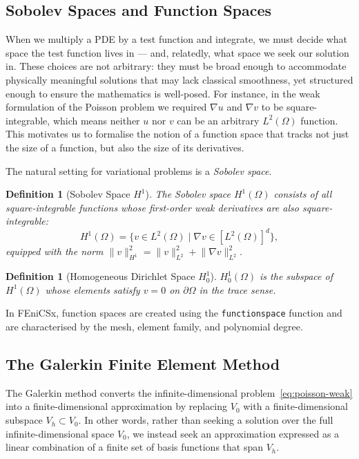 \documentclass[11pt]{article}
\newtheorem{definition}[theorem]{Definition}
\newcommand{\norm}[1]{\lVert #1 \rVert}
\newcommand{\domain}{\Omega}
\newcommand{\boundary}{\partial\Omega}
\begin{document}
\subsection{Sobolev Spaces and Function Spaces}

When we multiply a PDE by a test function and integrate, we must decide what
space the test function lives in --- and, relatedly, what space we seek our
solution in. These choices are not arbitrary: they must be broad enough to
accommodate physically meaningful solutions that may lack classical smoothness,
yet structured enough to ensure the mathematics is well-posed. For instance, in
the weak formulation of the Poisson problem we required $\nabla u$ and $\nabla
v$ to be square-integrable, which means neither $u$ nor $v$ can be an arbitrary
$L^2(\domain)$ function. This motivates us to formalise the notion of a
function space that tracks not just the size of a function, but also the size of its derivatives.

The natural setting for variational problems is a \emph{Sobolev space}.
\begin{definition}[Sobolev Space $H^1$]
The Sobolev space $H^1(\domain)$ consists of all square-integrable functions
whose first-order weak derivatives are also square-integrable:
\begin{equation*}
  H^1(\domain) = \bigl\{ v \in L^2(\domain)
    \mid \nabla v \in [L^2(\domain)]^d \bigr\},
\end{equation*}
equipped with the norm
$\norm{v}_{H^1}^2 = \norm{v}_{L^2}^2 + \norm{\nabla v}_{L^2}^2$.
\end{definition}

\begin{definition}[Homogeneous Dirichlet Space $H^1_0$]
\label{def:H10}
$H^1_0(\domain)$ is the subspace of $H^1(\domain)$ whose elements satisfy
$v = 0$ on $\boundary$ in the trace sense.
\end{definition}

In FEniCSx, function spaces are created using the \texttt{functionspace}
function and are characterised
by the mesh, element family, and polynomial degree.

\subsection{The Galerkin Finite Element Method}

The Galerkin method converts the infinite-dimensional problem~\eqref{eq:poisson-weak}
into a finite-dimensional approximation by replacing $V_0$ with a finite-dimensional
subspace $V_h \subset V_0$. In other words, rather than seeking a solution over
the full infinite-dimensional space $V_0$, we instead seek an approximation
expressed as a linear combination of a finite set of basis functions that span $V_h$.
\end{document}
